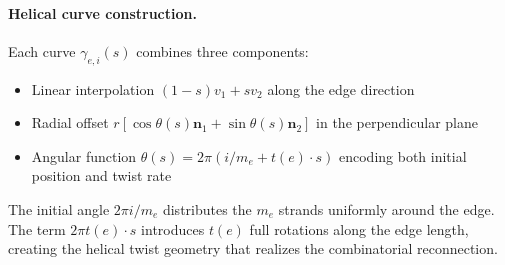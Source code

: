 \documentclass[acmtog,anonymous,review]{acmart}
\begin{document}
\paragraph{Helical curve construction.}
Each curve $\gamma_{e,i}(s)$ combines three components:
\begin{itemize}
    \item Linear interpolation $(1-s)v_1 + sv_2$ along the edge direction
    \item Radial offset $r[\cos\theta(s)\mathbf{n}_1 + \sin\theta(s)\mathbf{n}_2]$ in the perpendicular plane
    \item Angular function $\theta(s) = 2\pi(i/m_e + t(e) \cdot s)$ encoding both initial position and twist rate
\end{itemize}

The initial angle $2\pi i/m_e$ distributes the $m_e$ strands uniformly around the edge. The term $2\pi t(e) \cdot s$ introduces $t(e)$ full rotations along the edge length, creating the helical twist geometry that realizes the combinatorial reconnection.
\end{document}

